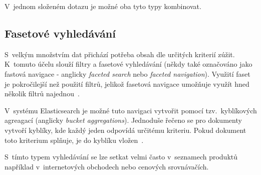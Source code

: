 V~jednom složeném dotazu je možné oba tyto typy kombinovat.

\subsection{Fasetové vyhledávání}
S~velkým množstvím dat přichází potřeba obsah dle určitých kriterií zúžit. K~tomuto účelu slouží filtry a fasetové vyhledávání (někdy také označováno jako fastová navigace - anglicky \emph{faceted search} nebo \emph{faceted navigation}). Využití faset je pokročilejší než použití filtrů, jelikož fasetová navigace umožňuje využít hned několik filtrů najednou~\cite{bib:facet}.

V~systému Elasticsearch je možné tuto navigaci vytvořit pomocí tzv.~kyblíkových agreagací (anglicky \emph{bucket aggregations}).
Jednoduše řečeno se pro dokumenty vytvoří kyblíky, kde každý jeden odpovídá určitému kriteriu. Pokud dokument toto kriterium splňuje, je do kyblíku vložen~\cite{bib:elastic-bucket}.

S~tímto typem vyhledávání se lze setkat velmi často v~seznamech produktů například v~internetových obchodech nebo cenových srovnávačích.

